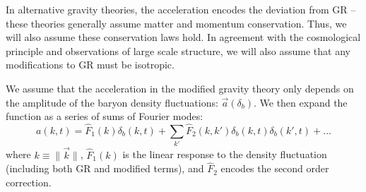 \documentclass[floats,floatfix,showpacs,amssymb,amsmath,prl,twocolumn,superscriptaddress,nofootinbib, aps]{revtex4-2}
\begin{document}
In alternative gravity theories, the acceleration encodes the deviation from GR -- these theories generally assume matter and momentum conservation. Thus, we will also assume these conservation laws hold. In agreement with the cosmological principle and observations of large scale structure, we will also assume that any modifications to GR must be isotropic. 


We assume that the acceleration in the modified gravity theory only depends on the amplitude of the baryon density fluctuations: $\vec a(\delta_b)$. We then expand the function as a series of sums of Fourier modes:
\begin{equation}
    a(k,t) = \hat{F}_1(k) \delta_b(k,t) + \sum_{k'} \hat{F}_2(k, k') \delta_b(k,t) \delta_b(k',t) + \ldots
\end{equation}
where $k \equiv \lVert\vec{k}\rVert$, $\hat{F}_1(k)$ is the linear response to the density fluctuation (including both GR and modified terms), and $\hat{F}_2$ encodes the second order correction.

\end{document}
